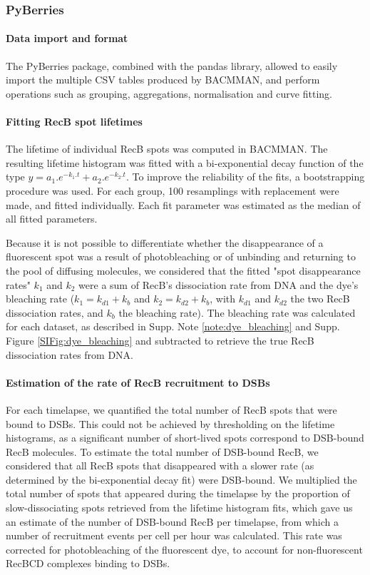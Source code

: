\subsubsection*{PyBerries}
\paragraph*{Data import and format}
The PyBerries package, combined with the pandas library, allowed to easily import the multiple CSV tables produced by BACMMAN, and perform operations such as grouping, aggregations, normalisation and curve fitting.

\paragraph*{Fitting RecB spot lifetimes}
The lifetime of individual Rec\-B spots was computed in BACMMAN. The resulting lifetime histogram was fitted with a bi-exponential decay function of the type $y=a_1.e^{-k_1.t} + a_2.e^{-k_2.t}$. To improve the reliability of the fits, a bootstrapping procedure was used. For each group, 100 resamplings with replacement were made, and fitted individually. Each fit parameter was estimated as the median of all fitted parameters.

Because it is not possible to differentiate whether the disappearance of a fluorescent spot was a result of photobleaching or of unbinding and returning to the pool of diffusing molecules, we considered that the fitted "spot disappearance rates" $k_1$ and $k_2$ were a sum of RecB's dissociation rate from DNA and the dye's bleaching rate ($k_1=k_{d1}+k_b$ and $k_2=k_{d2}+k_b$, with $k_{d1}$ and $k_{d2}$ the two RecB dissociation rates, and $k_b$ the bleaching rate). The bleaching rate was calculated for each dataset, as described in Supp. Note \ref{note:dye_bleaching} and Supp. Figure \ref{SIFig:dye_bleaching} and subtracted to retrieve the true RecB dissociation rates from DNA.

\paragraph*{Estimation of the rate of RecB recruitment to DSBs}
For each timelapse, we quantified the total number of RecB spots that were bound to DSBs. This could not be achieved by thresholding on the lifetime histograms, as a significant number of short-lived spots correspond to DSB-bound RecB molecules. To estimate the total number of DSB-bound RecB, we considered that all RecB spots that disappeared with a slower rate (as determined by the bi-exponential decay fit) were DSB-bound. We multiplied the total number of spots that appeared during the timelapse by the proportion of slow-dissociating spots retrieved from the lifetime histogram fits, which gave us an estimate of the number of DSB-bound RecB per timelapse, from which a number of recruitment events per cell per hour was calculated. This rate was corrected for photobleaching of the fluorescent dye, to account for non-fluorescent RecBCD complexes binding to DSBs.

